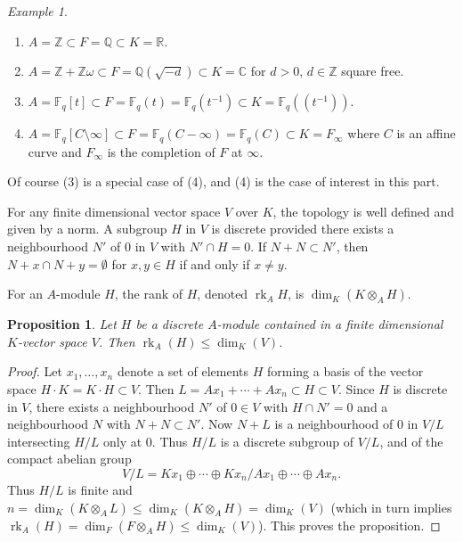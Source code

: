 \documentclass[12pt,a4paper]{article}
\theoremstyle{plain}
\newtheorem{proposition}{Proposition}[section]
\theoremstyle{definition}
\theoremstyle{remark}
\newtheorem{example}{Example}[section]
\newcommand{\bF}{\mathbb{F}}
\newcommand{\bQ}{\mathbb{Q}}
\newcommand{\bC}{\mathbb{C}}
\newcommand{\bZ}{\mathbb{Z}}
\newcommand{\bR}{\mathbb{R}}
\providecommand{\rk}{\operatorname{rk}}
\begin{document}
\begin{example}
\label{ex:discrete}
\begin{enumerate}[label=(\arabic*)]
\item $A = \bZ \subset F = \bQ \subset K = \bR$.
\item $A = \bZ + \bZ\omega \subset F = \bQ(\sqrt{-d}) \subset K = \bC$ for $d > 0$, $d \in \bZ$ square free.
\item $A = \bF_q[t] \subset F = \bF_q(t) = \bF_q(t^{-1}) \subset K = \bF_q((t^{-1}))$.
\item $A = \bF_q[C \setminus \infty] \subset F = \bF_q(C - \infty) = \bF_q(C) \subset K = F_\infty$ where $C$ is an affine curve and $F_\infty$ is the completion of $F$ at $\infty$.
\end{enumerate}
Of course (3) is a special case of (4), and (4) is the case of interest in this part.
\end{example}

For any finite dimensional vector space $V$ over $K$, the topology is well defined and given by a norm. A subgroup $H$ in $V$ is discrete provided there exists a neighbourhood $N'$ of $0$ in $V$ with $N' \cap H = 0$. If $N + N \subset N'$, then $N + x \cap N + y = \emptyset$ for $x, y \in H$ if and only if $x \neq y$.

For an $A$-module $H$, the rank of $H$, denoted $\rk_A H$, is $\dim_K(K \otimes_A H)$.

\begin{proposition}
\label{prop:rank}
Let $H$ be a discrete $A$-module contained in a finite dimensional $K$-vector space $V$. Then $\rk_A(H) \leq \dim_K(V)$.
\end{proposition}

\begin{proof}
Let $x_1, \ldots, x_n$ denote a set of elements $H$ forming a basis of the vector space $H \cdot K = K \cdot H \subset V$. Then $L = Ax_1 + \cdots + Ax_n \subset H \subset V$. Since $H$ is discrete in $V$, there exists a neighbourhood $N'$ of $0 \in V$ with $H \cap N' = 0$ and a neighbourhood $N$ with $N + N \subset N'$. Now $N + L$ is a neighbourhood of $0$ in $V/L$ intersecting $H/L$ only at $0$. Thus $H/L$ is a discrete subgroup of $V/L$, and of the compact abelian group
\[
V/L = Kx_1 \oplus \cdots \oplus Kx_n / Ax_1 \oplus \cdots \oplus Ax_n.
\]
Thus $H/L$ is finite and $n = \dim_K(K \otimes_A L) \leq \dim_K(K \otimes_A H) = \dim_K(V)$ (which in turn implies $\rk_A(H) = \dim_F(F \otimes_A H) \leq \dim_K(V)$). This proves the proposition.
\end{proof}
\end{document}
